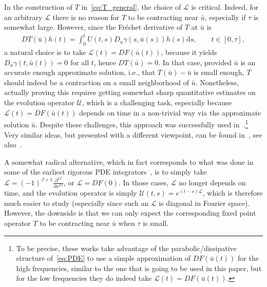 \documentclass[10pt,a4paper]{article}
\theoremstyle{plain}
\newcommand{\U}{\mathcal{U}}
\renewcommand{\L}{\mathcal{L}}
\newcommand{\bu}{\bar{u}}
\newcommand{\1}{\mathbf{1}}
\renewcommand{\d}{\mathrm{d}}
\begin{document}
In the construction of $T$ in~\eqref{eq:T_general}, the choice of $\L$ is critical. Indeed, for an arbitrary $\L$ there is no reason for $T$ to be contracting near $\bu$, especially if $\tau$ is somewhat large. However, since the Fréchet derivative of $T$ at $\bu$ is
\begin{align*}
DT(\bu)h(t) = \int_0^t U(t,s) D_u\gamma(s,\bu(s))h(s) \d s,\qquad t\in[0,\tau],
\end{align*}
a natural choice is to take $\L(t)=DF(\bu(t))$, because it yields $D_u\gamma(t,\bu(t)) = 0$ for all $t$, hence $DT(\bu) = 0$. In that case, provided $\bu$ is an accurate enough approximate solution, i.e., that $T(\bu)-\bu$ is small enough, $T$ should indeed be a contraction on a small neighborhood of $\bu$. Nonetheless, actually proving this requires getting somewhat sharp quantitative estimates on the evolution operator $\U$, which is a challenging task, especially because $\L(t)=DF(\bu(t))$ depends on time in a non-trivial way via the approximate solution $\bu$. Despite these challenges, this approach was successfully used in~\cite{TakMizKubOis17,TakLesJaqOka22,DucLesTak25}.\footnote{To be precise, these works take advantage of the parabolic/dissipative structure of~\eqref{eq:PDE} to use a simple approximation of $DF(\bu(t))$ for the high frequencies, similar to the one that is going to be used in this paper, but for the low frequencies they do indeed take $\L(t)=DF(\bu(t))$.} Very similar ideas, but presented with a different viewpoint, can be found in~\cite{HasKimMinNak19,HasKinNak20}, see also~\cite[Chapter 5]{NakPluWat19}. 

A somewhat radical alternative, which in fact corresponds to what was done in some of the earliest rigorous PDE integrators~\cite{Nak91,AriKoc10bis}, is to simply take $\L=(-1)^{J+1} \tfrac{ \partial^{2J}}{ \partial x^{2J}}$, or $\L = DF(0)$. In those cases, $\L$ no longer depends on time, and the evolution operator is simply $\U(t,s) = e^{(t-s)\L}$, which is therefore much easier to study (especially since such an $\L$ is diagonal in Fourier space). However, the downside is that we can only expect the corresponding fixed point operator $T$ to be contracting near $\bu$ when $\tau$ is small.
\end{document}
